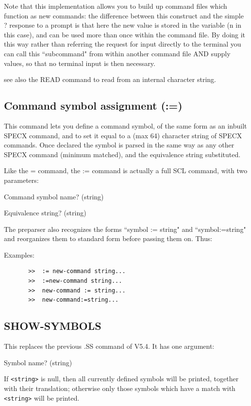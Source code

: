 \documentclass[11pt,twoside]{report}
\begin{document}
Note that this implementation allows you to build up command files which
function as new commands: the difference between this construct and the simple
? response to a prompt is that here the new value is stored in the variable (n
in this case), and can be used more than once within the command file. By doing
it this way rather than referring the request for input directly to the
terminal you can call this ``subcommand" from within another command file AND
supply values, so that no terminal input is then necessary.

see also the READ command to read from an internal character string.
        
\subsection{Command symbol assignment (:=)}\index{:=}

This command lets you define a command symbol, of the same form as an inbuilt
SPECX command, and to set it equal to a (max 64) character string of SPECX
commands. Once declared the symbol is parsed in the same way as any other SPECX
command (\ie minimum matched), and the
equivalence string substituted. 

Like the = command, the := command is actually a full SCL command, with two
parameters:
\begin{description}
\item {Command symbol name?}  (string)
\item {Equivalence string?}   (string)
\end{description}
The preparser also recognizes the forms ``symbol :=
string" and ``symbol:=string" and reorganizes them to standard form before
passing them on. Thus: 

Examples:   
\begin{verbatim}
       >>  := new-command string...
       >>  :=new-command string...
       >>  new-command := string...
       >>  new-command:=string...
\end{verbatim}


\subsection{SHOW-SYMBOLS}

This replaces the previous .SS command of V5.4.
It has one argument: 
\begin{description}
\item  {Symbol name?}   (string)
\end{description}
If \verb+<string>+ is null, then all currently defined symbols will be printed,
together with their translation; otherwise only those symbols which have
a match with \verb+<string>+ will be printed.
\end{document}
